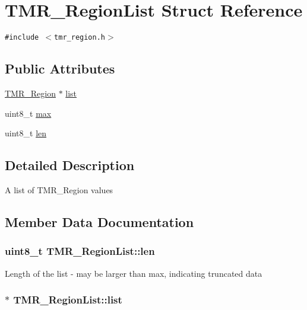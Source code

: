 \hypertarget{struct_t_m_r___region_list}{
\section{TMR\_\-RegionList Struct Reference}
\label{struct_t_m_r___region_list}
}
{\tt \#include $<$tmr\_\-region.h$>$}

\subsection*{Public Attributes}
\begin{CompactItemize}
\item 
\hyperlink{tmr__region_8h_f43f710859d6253c17c6caecb47616c2}{TMR\_\-Region} $\ast$ \hyperlink{struct_t_m_r___region_list_38b8e9be65c24dbf873bf31b2c8401bc}{list}
\item 
uint8\_\-t \hyperlink{struct_t_m_r___region_list_4d09327b5a3395f171579d3d4f775cb8}{max}
\item 
uint8\_\-t \hyperlink{struct_t_m_r___region_list_d3d947c9a0666559b0119c49097b8a71}{len}
\end{CompactItemize}


\subsection{Detailed Description}
A list of TMR\_\-Region values 

\subsection{Member Data Documentation}
\hypertarget{struct_t_m_r___region_list_d3d947c9a0666559b0119c49097b8a71}{
\subsubsection[{len}]{\setlength{\rightskip}{0pt plus 5cm}uint8\_\-t {\bf TMR\_\-RegionList::len}}}
\label{struct_t_m_r___region_list_d3d947c9a0666559b0119c49097b8a71}


Length of the list - may be larger than max, indicating truncated data \hypertarget{struct_t_m_r___region_list_38b8e9be65c24dbf873bf31b2c8401bc}{
\subsubsection[{list}]{$\ast$ {\bf TMR\_\-RegionList::list}}}
\label{struct_t_m_r___region_list_38b8e9be65c24dbf873bf31b2c8401bc}


